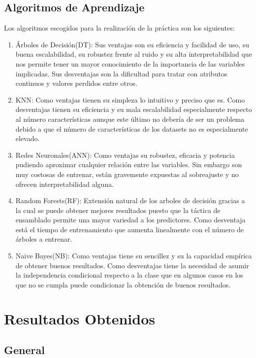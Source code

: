 \documentclass[..]{subfiles}
\begin{document}
\subsection{Algoritmos de Aprendizaje}
Los algoritmos escogidos para la realización de la práctica son los siguientes:
\begin{enumerate}
	\item Árboles de Decisión(DT): Sus ventajas son su eficiencia y facilidad de uso, su buena escalabilidad, su robustez frente al ruido y su alta interpretabilidad que nos permite tener un mayor conocimiento de la importancia de las variables implicadas. Sus desventajas son la dificultad para tratar con atributos continuos y valores perdidos entre otros.
	\item KNN: Como ventajas tienen su simpleza lo intuitivo y preciso que es. Como desventajas tienen su eficiencia y su mala escalabilidad especialmente respecto al número características aunque este último no debería de ser un problema debido a que el número de características de los datasets no es especialmente elevado.
	\item Redes Neuronales(ANN): Como ventajas su robustez, eficacia y potencia pudiendo aproximar cualquier relación entre las variables. Sin embargo son muy costosas de entrenar, están gravemente expuestas al sobreajuste y no ofrecen interpretabilidad alguna.
	\item Random Forests(RF): Extensión natural de los arboles de decisión gracias a la cual se puede obtener mejores resultados puesto que la táctica de ensamblado permite una mayor variedad a los predictores. Como desventaja está el tiempo de entrenamiento que aumenta linealmente con el número de árboles a entrenar.
	\item Naive Bayes(NB): Como ventajas tiene su sencillez y su la capacidad empírica de obtener buenos resultados. Como desventajas tiene la necesidad de asumir la independencia condicional respecto a la clase que en algunos casos en los que no se cumpla puede condicionar la obtención de buenos resultados. 
\end{enumerate}



\section{Resultados Obtenidos}

\subsection{General}
\end{document}
